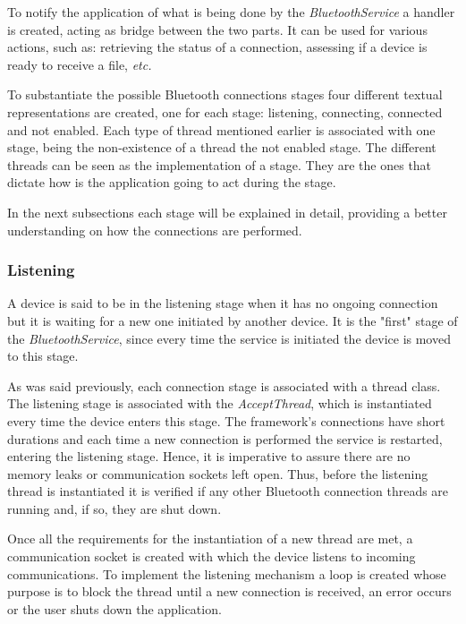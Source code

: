 To notify the application of what is being done by the \textit{BluetoothService} a handler is created, acting as bridge between the two parts. It can be used for various actions, such as: retrieving the status of a connection, assessing if a device is ready to receive a file, \textit{etc.}

To substantiate the possible Bluetooth connections stages four different textual representations are created, one for each stage: listening, connecting, connected and not enabled. Each type of thread mentioned earlier is associated with one stage, being the non-existence of a thread the not enabled stage. The different threads can be seen as the implementation of a stage. They are the ones that dictate how is the application going to act during the stage. 

In the next subsections each stage will be explained in detail, providing a better understanding on how the connections are performed.

\subsubsection{Listening}
\label{subsubsec:listening}

A device is said to be in the listening stage when it has no ongoing connection but it is waiting for a new one initiated by another device. It is the "first" stage of the \textit{BluetoothService}, since every time the service is initiated the device is moved to this stage.

As was said previously, each connection stage is associated with a thread class. The listening stage is associated with the \textit{AcceptThread}, which is instantiated every time the device enters this stage. The framework's connections have short durations and each time a new connection is performed the service is restarted, entering the listening stage. Hence, it is imperative to assure there are no memory leaks or communication sockets left open. Thus, before the listening thread is instantiated it is verified if any other Bluetooth connection threads are running and, if so, they are shut down.

Once all the requirements for the instantiation of a new thread are met, a communication socket is created with which the device listens to incoming communications. To implement the listening mechanism a loop is created whose purpose is to block the thread until a new connection is received, an error occurs or the user shuts down the application.

